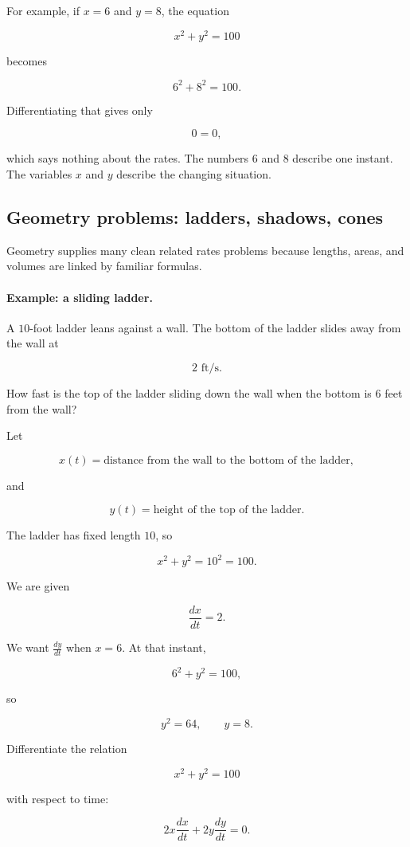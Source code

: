 For example, if \(x=6\) and \(y=8\), the equation

\[
x^2+y^2=100
\]

becomes

\[
6^2+8^2=100.
\]

Differentiating that gives only

\[
0=0,
\]

which says nothing about the rates.  The numbers \(6\) and \(8\) describe one instant.
The variables \(x\) and \(y\) describe the changing situation.

\subsection{Geometry problems: ladders, shadows, cones}
\label{subsec:geometry-related-rates}

Geometry supplies many clean related rates problems because lengths, areas, and volumes
are linked by familiar formulas.

\paragraph{Example: a sliding ladder.}
A \(10\)-foot ladder leans against a wall.  The bottom of the ladder slides away from the
wall at

\[
2\text{ ft/s}.
\]

How fast is the top of the ladder sliding down the wall when the bottom is \(6\) feet from
the wall?

Let

\[
x(t)=\text{distance from the wall to the bottom of the ladder},
\]

and

\[
y(t)=\text{height of the top of the ladder}.
\]

The ladder has fixed length \(10\), so

\[
x^2+y^2=10^2=100.
\]

We are given

\[
\frac{dx}{dt}=2.
\]

We want \(\frac{dy}{dt}\) when \(x=6\).  At that instant,

\[
6^2+y^2=100,
\]

so

\[
y^2=64,
\qquad
y=8.
\]

Differentiate the relation

\[
x^2+y^2=100
\]

with respect to time:

\[
2x\frac{dx}{dt}+2y\frac{dy}{dt}=0.
\]

